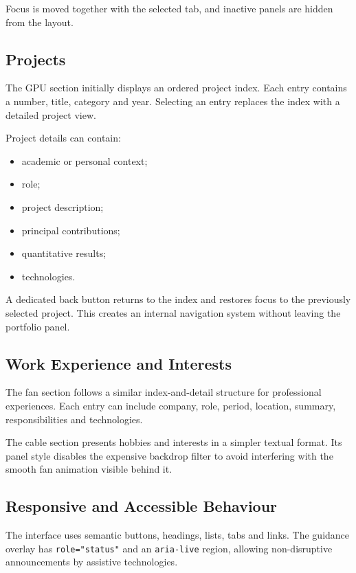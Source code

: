 \documentclass{report}
\begin{document}
Focus is moved together with the selected tab, and inactive panels are
hidden from the layout.

\subsection{Projects}

The GPU section initially displays an ordered project index. Each entry
contains a number, title, category and year. Selecting an entry replaces
the index with a detailed project view.

Project details can contain:

\begin{itemize}
    \item academic or personal context;
    \item role;
    \item project description;
    \item principal contributions;
    \item quantitative results;
    \item technologies.
\end{itemize}

A dedicated back button returns to the index and restores focus to the
previously selected project. This creates an internal navigation system
without leaving the portfolio panel.

\subsection{Work Experience and Interests}

The fan section follows a similar index-and-detail structure for
professional experiences. Each entry can include company, role, period,
location, summary, responsibilities and technologies.

The cable section presents hobbies and interests in a simpler textual
format. Its panel style disables the expensive backdrop filter to avoid
interfering with the smooth fan animation visible behind it.

\subsection{Responsive and Accessible Behaviour}

The interface uses semantic buttons, headings, lists, tabs and links.
The guidance overlay has \texttt{role="status"} and an
\texttt{aria-live} region, allowing non-disruptive announcements by
assistive technologies.
\end{document}
